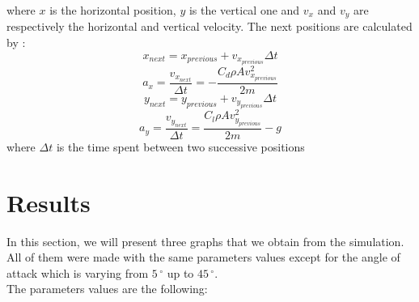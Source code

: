 \documentclass[10pt,a4paper]{report}
\begin{document}

where $x$ is the horizontal position, $y$ is the vertical one and $v_x$ and $v_y$ are respectively the horizontal and vertical velocity.
The next positions are calculated by :
\[x_{next} = x_{previous} + v_{x_{previous}} \Delta t \]
\[a_x=\frac{v_{x_{next}}}{\Delta t} = -\frac{C_d \rho A  v_{x_{previous}}^2}{2m}\]
\[y_{next} = y_{previous} + v_{y_{previous}} \Delta t \]
\[a_y = \frac{v_{y_{next}}}{\Delta t} = \frac{C_l \rho A  v_{y_{previous}}^2}{2m} - g\]
where $\Delta t$ is the time spent between two successive positions
\section{Results}
In this section, we will present three graphs that we obtain from the simulation. All of them were made with the same parameters values except for the angle of attack which is varying from $5\,^{\circ}$ up to $45\,^{\circ} $. 
\\The parameters values are the following:
\end{document}
